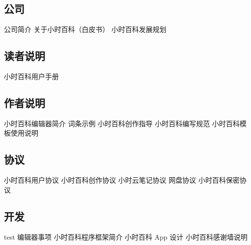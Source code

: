 
\subsection{公司}
公司简介
关于小时百科（白皮书）
小时百科发展规划

\subsection{读者说明}
小时百科用户手册

\subsection{作者说明}
小时百科编辑器简介
词条示例
小时百科创作指导
小时百科编写规范
小时百科模板使用说明

\subsection{协议}
小时百科用户协议
小时百科创作协议
小时云笔记协议
网盘协议
小时百科保密协议

\subsection{开发}
test
编辑器事项
小时百科程序框架简介
小时百科 App 设计
小时百科感谢墙说明
